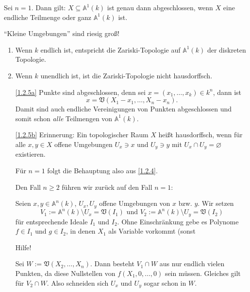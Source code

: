 \documentclass[a4paper,12pt]{scrbook}
\makeatletter
\theoremstyle{blah}
\theoremstyle{stz}
\renewcommand{\proofname}{Beweis}
\renewenvironment{proof}[1][\proofname]{\par
  \pushQED{\qed}%
  \normalfont \topsep6\p@\@plus6\p@\relax
  \trivlist
  \item[\hskip\labelsep
        \itshape
    #1\@addpunct{:}]\ignorespaces
}{%
  \popQED\endtrivlist\@endpefalse
}
\def\A{\mathbb{A}}
\def\V{\mathfrak{V}}
\newcommand{\leer}{\ensuremath{\varnothing}}
\makeatother
\begin{document}
\begin{bsp}\label{1.2.4}
Sei $n=1$. Dann gilt: $X\subseteq\A^{1}(k)$ ist genau dann abgeschlossen, wenn $X$ eine endliche Teilmenge oder ganz $\A^{1}(k)$ ist.
\end{bsp}

\begin{w}\enquote{Kleine Umgebungen} sind riesig groß!\end{w}

\begin{bem}\label{1.2.5}
\begin{enumerate}
\item\label{1.2.5a} Wenn $k$ endlich ist, entspricht die Zariski-Topologie auf $\A^{1}(k)$ der diskreten Topologie.
\item\label{1.2.5b} Wenn $k$ unendlich ist, ist die Zariski-Topologie nicht hausdorffsch.
\end{enumerate}\end{bem}
\begin{proof}\begin{enumerate}
\item[\ref{1.2.5a}] Punkte sind abgeschlossen, denn sei $x=(x_{1},\dotsc,x_{k})\in k^{n}$, dann ist
\[{x}=\V(X_{1}-x_{1},\dotsc,X_{n}-x_{n}).\]
Damit sind auch endliche Vereinigungen von Punkten abgeschlossen und somit schon \emph{alle} Teilmengen von $\A^{1}(k)$.
\item[\ref{1.2.5b}] {\sc Erinnerung:} Ein topologischer Raum $X$ heißt hausdorffsch, wenn für alle $x,y\in X$ offene Umgebungen $U_{x}\ni x$ und $U_{y}\ni y$ mit $U_{x}\cap U_{y}=\leer$ existieren.

Für $n=1$ folgt die Behauptung also aus \autoref{1.2.4}.

Den Fall $n\geq 2$ führen wir zurück auf den Fall $n=1$:

Seien $x,y\in\A^{n}(k)$, $U_{x},U_{y}$ offene Umgebungen von $x$ bzw. $y$. Wir setzen
\[V_{1}:=\A^{n}(k)\setminus U_{x} = \V(I_{1})\text{ und }V_{2}:=\A^{n}(k)\setminus U_{y}=\V(I_{2})\]
für entsprechende Ideale $I_{1}$ und $I_{2}$. Ohne Einschränkung gebe es Polynome $f\in I_{1}$ und $g\in I_{2}$, in denen $X_{1}$ als Variable vorkommt (sonst

\begin{w}Hilfe!\end{w}

Sei $W:=\V(X_{2},\dotsc,X_{n})$. Dann besteht $V_{1}\cap W$ aus nur endlich vielen Punkten, da diese Nullstellen von $f(X_{1},0,\dotsc,0)$ sein müssen. Gleiches gilt für $V_{2}\cap W$. Also schneiden sich $U_{x}$ und $U_{y}$ sogar schon in $W$.
\end{enumerate}\end{proof}
\end{document}
